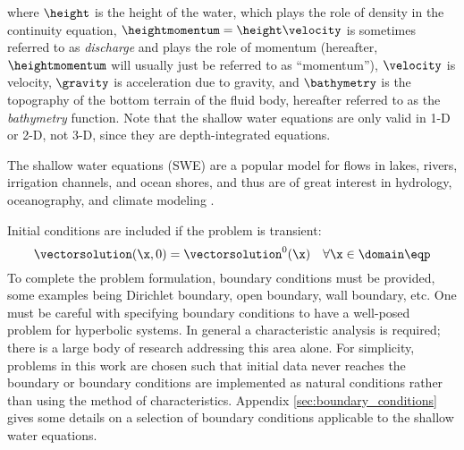 where $\height$ is the height of the water, which plays the role of density
in the continuity equation, $\heightmomentum=\height\velocity$ is sometimes
referred to as \emph{discharge} and plays the role of momentum (hereafter,
$\heightmomentum$ will usually just be referred to as ``momentum''),
$\velocity$ is velocity, $\gravity$
is acceleration due to gravity, and $\bathymetry$ is the topography of the
bottom terrain of the fluid body, hereafter referred to as the \emph{bathymetry}
function.
Note that the shallow water equations are only valid in 1-D or 2-D, not 3-D,
since they are depth-integrated equations.

The shallow water equations (SWE) are a popular model for flows in lakes, rivers,
irrigation channels, and ocean shores, and thus are of great interest
in hydrology, oceanography, and climate modeling
\cite{bernetti2008}\cite{fjordholm2011}.

Initial conditions are included if the problem is transient:
\begin{equation}
   \vectorsolution(\x,0) = \vectorsolution^0(\x)
   \quad \forall \x\in\domain \eqp
\end{equation}
To complete the problem formulation, boundary
conditions must be provided, some examples being
Dirichlet boundary, open boundary, wall boundary, etc.
One must be careful with specifying boundary conditions to have
a well-posed problem for hyperbolic systems.
In general a characteristic analysis is required; there is a large body of research
addressing this area alone. For simplicity, problems in this work are
chosen such that initial data never reaches the boundary
or boundary conditions are implemented as natural conditions
rather than using the method of characteristics.
Appendix \ref{sec:boundary_conditions} gives some details on a selection
of boundary conditions applicable to the shallow water equations.

